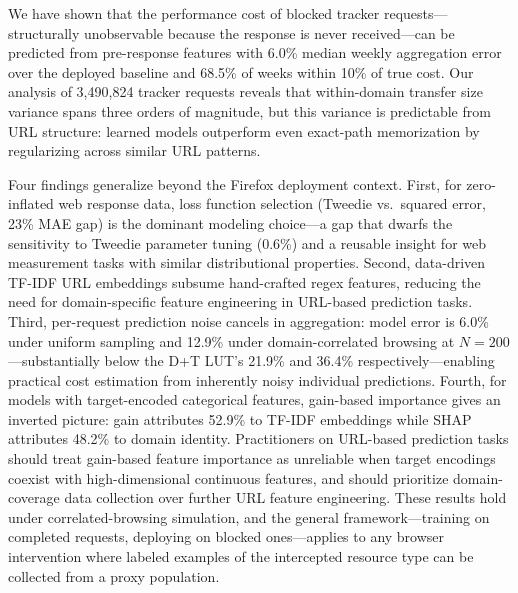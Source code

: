 \documentclass[sigconf,nonacm]{acmart}
\newcommand{\numrequests}{3{,}490{,}824\xspace}
\begin{document}
We have shown that the performance cost of blocked tracker requests---structurally unobservable because the response is never received---can be predicted from pre-response features with 6.0\% median weekly aggregation error over the deployed baseline and 68.5\% of weeks within 10\% of true cost.
Our analysis of \numrequests tracker requests reveals that within-domain transfer size variance spans three orders of magnitude, but this variance is predictable from URL structure: learned models outperform even exact-path memorization by regularizing across similar URL patterns.

Four findings generalize beyond the Firefox deployment context.
First, for zero-inflated web response data, loss function selection (Tweedie vs.\ squared error, 23\% MAE gap) is the dominant modeling choice---a gap that dwarfs the sensitivity to Tweedie parameter tuning (0.6\%) and a reusable insight for web measurement tasks with similar distributional properties.
Second, data-driven TF-IDF URL embeddings subsume hand-crafted regex features, reducing the need for domain-specific feature engineering in URL-based prediction tasks.
Third, per-request prediction noise cancels in aggregation: model error is 6.0\% under uniform sampling and 12.9\% under domain-correlated browsing at $N\!=\!200$---substantially below the D+T LUT's 21.9\% and 36.4\% respectively---enabling practical cost estimation from inherently noisy individual predictions.
Fourth, for models with target-encoded categorical features, gain-based importance gives an inverted picture: gain attributes 52.9\% to TF-IDF embeddings while SHAP attributes 48.2\% to domain identity. Practitioners on URL-based prediction tasks should treat gain-based feature importance as unreliable when target encodings coexist with high-dimensional continuous features, and should prioritize domain-coverage data collection over further URL feature engineering.
These results hold under correlated-browsing simulation, and the general framework---training on completed requests, deploying on blocked ones---applies to any browser intervention where labeled examples of the intercepted resource type can be collected from a proxy population.





\end{document}
